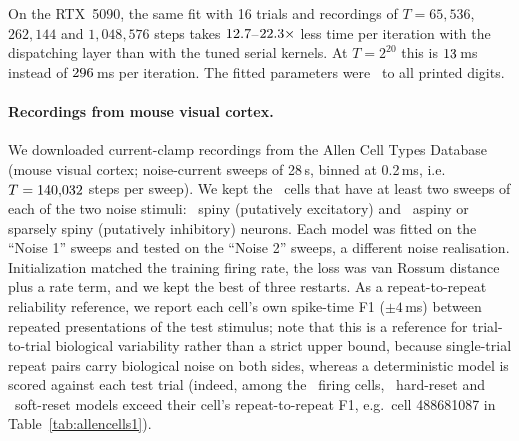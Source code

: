\documentclass[10pt]{article}
\theoremstyle{remark}
\begin{document}
On the RTX~5090, the same fit with 16 trials and recordings of $T=65{,}536$, $262{,}144$ and $1{,}048{,}576$ steps takes $12.7$--$22.3\times$ less time per iteration with the dispatching layer than with the tuned serial kernels. At $T=2^{20}$ this is $13$\,ms instead of $296$\,ms per iteration. The fitted parameters were \FitSameAll\ to all printed digits.

\paragraph{Recordings from mouse visual cortex.}
We downloaded current-clamp recordings from the Allen Cell Types Database (mouse visual cortex; noise-current sweeps of 28\,s, binned at 0.2\,ms, i.e.\ $T=140{,}032$ steps per sweep). We kept the \BigAllN\ cells that have at least two sweeps of each of the two noise stimuli: \BigSpinyN\ spiny (putatively excitatory) and \BigAspinyN\ aspiny or sparsely spiny (putatively inhibitory) neurons. Each model was fitted on the ``Noise 1'' sweeps and tested on the ``Noise 2'' sweeps, a different noise realisation. Initialization matched the training firing rate, the loss was van Rossum distance plus a rate term, and we kept the best of three restarts. As a repeat-to-repeat reliability reference, we report each cell's own spike-time F1 ($\pm4$\,ms) between repeated presentations of the test stimulus; note that this is a reference for trial-to-trial biological variability rather than a strict upper bound, because single-trial repeat pairs carry biological noise on both sides, whereas a deterministic model is scored against each test trial (indeed, among the \RelExceedCells\ firing cells, \RelExceedHard\ hard-reset and \RelExceedSoft\ soft-reset models exceed their cell's repeat-to-repeat F1, e.g.\ cell 488681087 in Table~\ref{tab:allencells1}).
\end{document}

